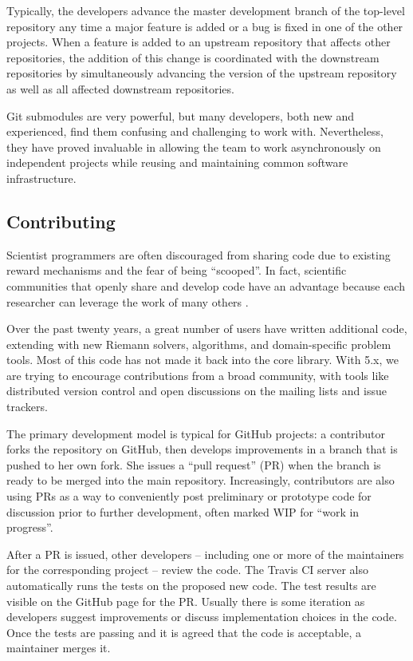 Typically, the \clawpack developers advance the master development
branch of the top-level repository any time a major feature is added
or a bug is fixed in one of the other projects.  When a feature is
added to an upstream repository that affects other repositories, the
addition of this change is coordinated with the downstream
repositories by simultaneously advancing the version of the upstream
repository as well as all affected downstream repositories.

Git submodules are very powerful, but many developers, both new and
experienced, find them confusing and challenging to work with.
Nevertheless, they have proved invaluable in allowing the \clawpack team to
work asynchronously on independent projects while reusing and maintaining
common software infrastructure.

\subsection{Contributing}

Scientist programmers are often discouraged from sharing code
due to existing reward mechanisms and the fear of being ``scooped''.
In fact, scientific communities that openly share and develop code
have an advantage because each researcher can leverage the work of
many others \cite{Turk:2013hd}.

Over the past twenty years, a great number of users have written
additional code, extending \clawpack with new Riemann solvers,
algorithms, and domain-specific problem tools.  Most of this code
has not made it back into the core library.  With \clawpack 5.x,
we are trying to encourage contributions from a broad community, with
tools like distributed version control and open discussions on 
the mailing lists and issue trackers.

The primary development model is typical for GitHub projects: a
contributor forks the repository on GitHub, then develops improvements
in a branch that is pushed to her own fork.  She issues a ``pull
request'' (PR) when the branch is ready to be merged into the main
repository.  Increasingly, contributors are also using PRs as a way to
conveniently post preliminary or prototype code for discussion prior
to further development, often marked WIP for ``work in progress''.

After a PR is issued, other developers -- including one or more of the
maintainers for the corresponding project -- review the code.  The Travis
CI server also automatically runs the tests on the proposed new code.  The test
results are visible on the GitHub page for the PR.  Usually there is
some iteration as developers suggest improvements or discuss
implementation choices in the code.  Once the tests are passing and it
is agreed that the code is acceptable, a maintainer merges it.


